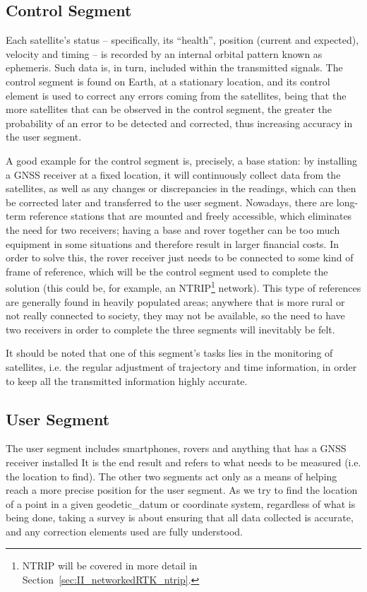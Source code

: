 \subsection{Control Segment}\label{sec:II_gnss_control_seg}

Each satellite's status -- specifically, its ``health'', position (current and expected), velocity and timing -- is recorded by an internal orbital pattern known as \gls{ephemeris}. Such data is, in turn, included within the transmitted signals. The control segment is found on Earth, at a stationary location, and its control element is used to correct any errors coming from the satellites, being that the more satellites that can be observed in the control segment, the greater the probability of an error to be detected and corrected, thus increasing accuracy in the user segment.

A good example for the control segment is, precisely, a base station: by installing a GNSS receiver at a fixed location, it will continuously collect data from the satellites, as well as any changes or discrepancies in the readings, which can then be corrected later and transferred to the user segment. Nowadays, there are long-term reference stations that are mounted and freely accessible, which eliminates the need for two receivers; having a base and rover together can be too much equipment in some situations and therefore result in larger financial costs.
In order to solve this, the rover receiver just needs to be connected to some kind of frame of reference, which will be the control segment used to complete the solution (this could be, for example, an NTRIP\footnote{NTRIP will be covered in more detail in Section~\ref{sec:II_networkedRTK_ntrip}.} network).
This type of references are generally found in heavily populated areas; anywhere that is more rural or not really connected to society, they may not be available, so the need to have two receivers in order to complete the three segments will inevitably be felt.

It should be noted that one of this segment's tasks lies in the monitoring of satellites, i.e. the regular adjustment of trajectory and time information, in order to keep all the transmitted information highly accurate.

\subsection{User Segment}\label{sec:II_gnss_user_seg}

The user segment includes smartphones, rovers and anything that has a GNSS receiver installed It is the end result and refers to what needs to be measured (i.e. the location to find). The other two segments act only as a means of helping reach a more precise position for the user segment.
As we try to find the location of a point in a given \gls{geodetic_datum} or coordinate system, regardless of what is being done, taking a survey is about ensuring that all data collected is accurate, and any correction elements used are fully understood.

